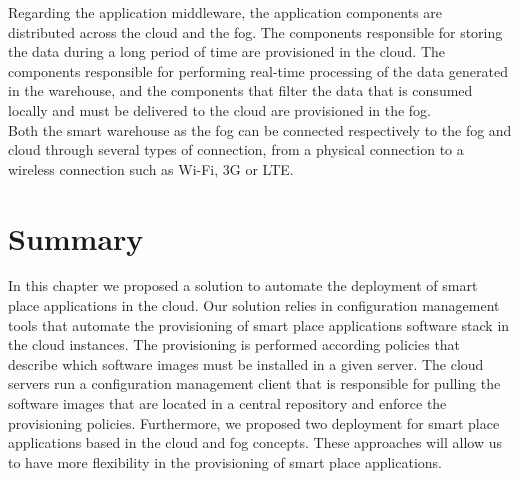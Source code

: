 Regarding the application middleware, the application components are distributed across the cloud and
the fog. The components responsible for storing the data during a long period of time are provisioned in
the cloud. The components responsible for performing real-time processing of the data generated in the
warehouse, and the components that filter the data that is consumed locally and must be delivered to
the cloud are provisioned in the fog.\\

Both the smart warehouse as the fog can be connected respectively to the fog and cloud through
several types of connection, from a physical connection to a wireless connection such as Wi-Fi, 3G or
\gls{LTE}.

\section{Summary}
\label{sec:sol_summary}
In this chapter we proposed a solution to automate the deployment of smart place applications in the
cloud. Our solution relies in configuration management tools that automate the provisioning of
smart place applications software stack in the cloud instances. The provisioning is performed
according policies that describe which software images must be installed in a given server. The cloud
servers run a configuration management client that is responsible for pulling the software images that
are located in a central  repository and enforce the provisioning policies. Furthermore, we proposed
two deployment for smart place applications based in the cloud and fog concepts. These approaches will
allow us to have more flexibility in the provisioning of smart place applications.
